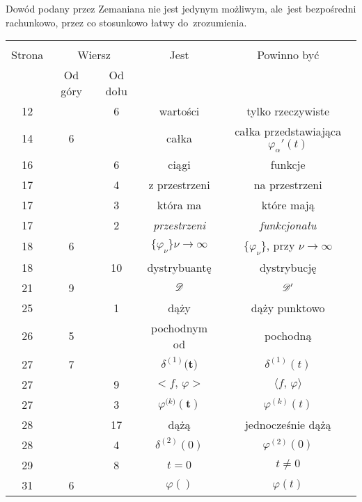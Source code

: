 \documentclass[a4paper,11pt]{article}
\begin{document}
Dowód podany przez Zemaniana nie jest jedynym możliwym, ale~jest
bezpośredni rachunkowo, przez co stosunkowo łatwy do~zrozumienia.







\begin{center}

  \begin{tabular}{|c|c|c|c|c|}
    \hline
    & \multicolumn{2}{c|}{} & & \\
    Strona & \multicolumn{2}{c|}{Wiersz} & Jest
                              & Powinno być \\ \cline{2-3}
    & Od góry & Od dołu & & \\
    \hline
    12  & &  6 & wartości & tylko rzeczywiste \\
    14  &  6 & & całka & całka przedstawiająca $\varphi_{ \alpha }'( t )$ \\
    16  & &  6 & ciągi & funkcje \\
    17  & &  4 & z przestrzeni & na przestrzeni \\
    17  & &  3 & która ma & które mają \\
    17  & &  2 & \textit{przestrzeni} & \textit{funkcjonału} \\
    18  &  6 & & $\{ \varphi_{ \nu } \}\nu \to \infty$
           & $\{ \varphi_{ \nu } \}$, przy $\nu \to \infty$ \\
    18  & & 10 & dystrybuantę & dystrybucję \\
    21  &  9 & & $\mathcal{D}$ & $\mathcal{D}'$ \\
    25  & &  1 & dąży & dąży punktowo \\
    26  &  5 & & pochodnym od & pochodną \\
    27  &  7 & & $\delta^{ ( 1 ) }\boldsymbol{ ( t } )$ & $\delta^{ ( 1 ) }( t )$ \\
    27  & &  9 & $< f,\, \varphi >$ & $\langle f, \, \varphi \rangle$ \\
    27  & &  3 & $\varphi^{ ( k \boldsymbol{ ) } }\boldsymbol{ ( t ) } $
           & $\varphi^{ ( k ) }( t )$ \\
    28  & & 17 & dążą & jednocześnie dążą \\
    28  & &  4 & $\delta^{ ( 2 ) }( 0 )$ & $\varphi^{ ( 2 ) }( 0 )$ \\
    29  & &  8 & $t = 0$ & $t \neq 0$ \\
    31  &  6 & & $\varphi( )$ & $\varphi( t )$ \\

\end{tabular}
\end{center}
\end{document}

